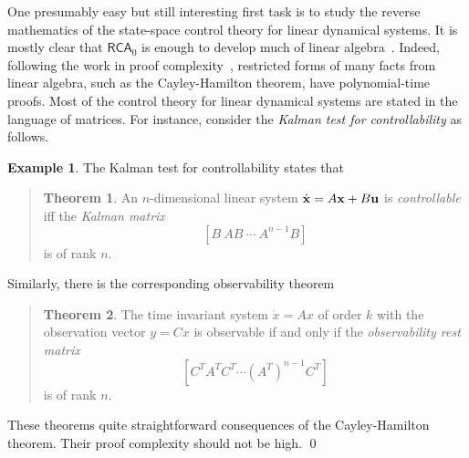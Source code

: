 \documentclass[10pt]{article}
\theoremstyle{definition}
\newtheorem{example}{Example}[section]
\newtheorem{theorem}{Theorem}[section]
\begin{document}
One presumably easy but still interesting first task is to study the reverse mathematics of the state-space control theory for linear dynamical systems. It is mostly clear that $\mathsf{RCA}_0$ is enough to develop much of linear algebra~\cite{Simpson}. Indeed, following the work in proof complexity~\cite{cookbook}, restricted forms of many facts from linear algebra, such as the Cayley-Hamilton theorem, have polynomial-time proofs. Most of the control theory for linear dynamical systems are stated in the language of matrices. For instance, consider the {\em Kalman test for controllability} as follows. 
\begin{example} The Kalman test for controllability states that 
\begin{quote}
\vspace{-.5cm}
\begin{theorem}An $n$-dimensional linear system $\dot {\bf x} = A{\bf x}+B{\bf u}$ is {\em controllable} iff the {\em Kalman matrix}
$$[B\ AB\ \cdots\ A^{n-1}B]$$
is of rank $n$.
\end{theorem} 
\end{quote}
Similarly, there is the corresponding observability theorem
\begin{quote}
\vspace{-.5cm}
\begin{theorem}
The time invariant system $\dot{x} = Ax$ of order $k$ with the observation vector $y=Cx$ is observable if and only if the {\em observability rest matrix}
$$[C^T A^TC^T \cdots (A^T)^{n-1}C^T]$$
is of rank $n$. 
\end{theorem}
\end{quote}
These theorems quite straightforward consequences of the Cayley-Hamilton theorem. Their proof complexity should not be high. \qed
\end{example}
\end{document}
